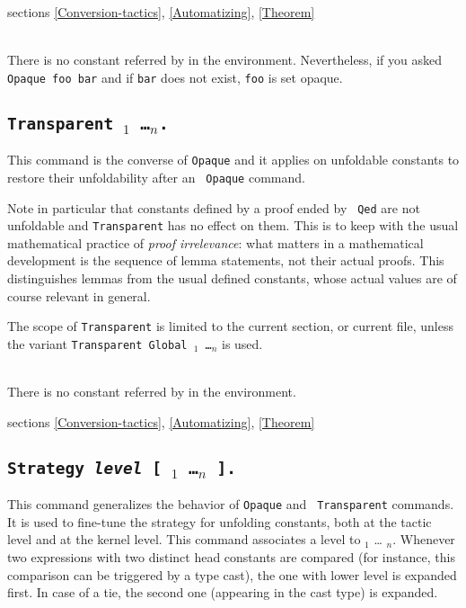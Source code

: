 \SeeAlso sections \ref{Conversion-tactics}, \ref{Automatizing},
\ref{Theorem}

\begin{ErrMsgs}
\item {}\\
    There is no constant referred by {\qualid} in the environment.
    Nevertheless, if you asked \texttt{Opaque foo bar}
    and if \texttt{bar} does not exist, \texttt{foo} is set opaque.
\end{ErrMsgs}

\subsection[\tt Transparent \qualid$_1$ \dots \qualid$_n$.]{\tt Transparent \qualid$_1$ \dots \qualid$_n$.\label{Transparent}}
This command is the converse of {\tt Opaque} and it applies on
unfoldable constants to restore their unfoldability after an {\tt
Opaque} command.

Note in particular that constants defined by a proof ended by {\tt
Qed} are not unfoldable and {\tt Transparent} has no effect on
them. This is to keep with the usual mathematical practice of {\em
proof irrelevance}: what matters in a mathematical development is the
sequence of lemma statements, not their actual proofs. This
distinguishes lemmas from the usual defined constants, whose actual
values are of course relevant in general.

The scope of {\tt Transparent} is limited to the current section, or
current file, unless the variant {\tt Transparent Global \qualid$_1$
\dots \qualid$_n$} is used.

\begin{ErrMsgs}
\item {}\\
    There is no constant referred by {\qualid} in the environment.
\end{ErrMsgs}

\SeeAlso sections \ref{Conversion-tactics}, \ref{Automatizing},
\ref{Theorem}

\subsection{\tt Strategy {\it level} [ \qualid$_1$ \dots \qualid$_n$
  ].\label{Strategy}}
This command generalizes the behavior of {\tt Opaque} and {\tt
  Transparent} commands. It is used to fine-tune the strategy for
unfolding constants, both at the tactic level and at the kernel
level. This command associates a level to \qualid$_1$ \dots
\qualid$_n$. Whenever two expressions with two distinct head
constants are compared (for instance, this comparison can be triggered
by a type cast), the one with lower level is expanded first. In case
of a tie, the second one (appearing in the cast type) is expanded.

